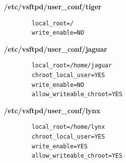 \documentclass[14pt, a4paper]{extreport}
\begin{document}
	\textbf{/etc/vsftpd/user\_conf/tiger}
	
	\begin{verbatim} 
		local_root=/
		write_enable=NO
	\end{verbatim}
	
	\textbf{/etc/vsftpd/user\_conf/jaguar}
	
	\begin{verbatim} 
		local_root=/home/jaguar
		chroot_local_user=YES
		write_enable=NO
		allow_writeable_chroot=YES
	\end{verbatim}
	
	\textbf{/etc/vsftpd/user\_conf/lynx}
	
	\begin{verbatim} 
		local_root=/home/lynx
		chroot_local_user=YES
		write_enable=YES
		allow_writeable_chroot=YES
	\end{verbatim}
\end{document}

